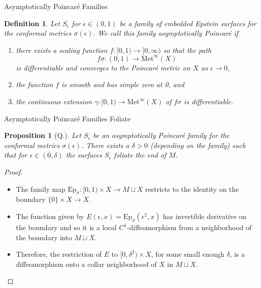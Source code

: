 \documentclass[professionalfont]{beamer}
\newtheorem*{prop*}{Proposition}
\newtheorem{defn}{Definition}
\begin{document}


\begin{frame}{Asymptotically Poincar\'e Families}

\begin{defn}
\label{asym-def}
Let $S_\epsilon$ for $\epsilon \in (0,1)$ be a family of embedded Epstein surfaces for the conformal metrics $\sigma(\epsilon)$. 
We call this family \emph{asymptotically Poincar\'e} if \pause
\begin{enumerate}
    \item there exists a scaling function $f:[0,1) \to [0,\infty)$ so that the path
    \[
f\sigma:(0,1) \to \mathrm{Met}^\infty(X)
\]
is differentiable and converges to the Poincar\'e metric on $X$ as $\epsilon \to 0$, \pause
    \item the function $f$ is smooth and has simple zero at 0, and \pause
    \item the continuous extension $\gamma:[0,1) \to \mathrm{Met}^\infty(X)$ of $f \sigma$ is differentiable.
\end{enumerate}

\end{defn}

\end{frame}




\begin{frame}{Asymptotically Poincar\'e Families Foliate}

\begin{prop*}[Q.]
Let $S_\epsilon$ be an asymptotically Poincar\'e family for the conformal metrics $\sigma(\epsilon)$. There exists a $\delta > 0$ (depending on the family) such that for $\epsilon \in (0,\delta)$ the surfaces $S_\epsilon$ foliate the end of $M$.
\end{prop*} \pause

\begin{proof}

\begin{itemize}

\item The family map $\mathrm{Ep}_{\sigma}: [0,1) \times X \to M \sqcup X$ restricts to the identity on the boundary $\{ 0 \} \times X \to X$. \pause

\item The function given by $E(\epsilon,x) = \mathrm{Ep}_\sigma(\epsilon^2,x)$ has invertible derivative on the boundary and so it is a local $C^1$-diffeomorphism from a neighborhood of the boundary into $M \sqcup X$. \pause

\item Therefore, the restriction of $E$ to $[0, \delta^2) \times X$, for some small
enough $\delta$, is a diffeomorphism onto a collar neighborhood of $X$ in $M \sqcup X$.

\end{itemize}

\end{proof}

\end{frame}
\end{document}
